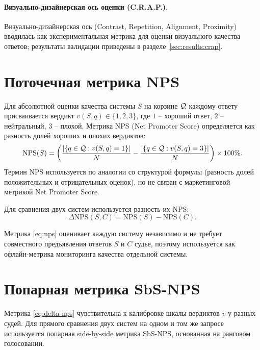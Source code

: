 \paragraph{Визуально-дизайнерская ось оценки (C.R.A.P.).}
Визуально-дизайнерская ось (Contrast, Repetition, Alignment, Proximity) вводилась как экспериментальная метрика для оценки визуального качества ответов; результаты валидации приведены в разделе~\ref{sec:results:crap}.

\section{Поточечная метрика NPS}
\label{sec:method:nps}

Для абсолютной оценки качества системы $S$ на корзине $\mathcal{Q}$ каждому
ответу присваивается вердикт $v(S, q) \in \{1, 2, 3\}$, где
$1$ -- хороший ответ, $2$ -- нейтральный, $3$ -- плохой.
Метрика NPS (Net Promoter Score) определяется как разность долей
хороших и плохих вердиктов:
\begin{equation}
    \label{eq:nps}
    \mathrm{NPS}(S) =
        \left(
            \frac{\left\lvert\{q \in \mathcal{Q} : v(S,q) = 1\}\right\rvert}{N}
            -
            \frac{\left\lvert\{q \in \mathcal{Q} : v(S,q) = 3\}\right\rvert}{N}
        \right)
        \times 100\%.
\end{equation}
\footnotesize Термин NPS используется по аналогии со структурой формулы (разность долей положительных и отрицательных оценок), но не связан с маркетинговой метрикой Net Promoter Score.\normalsize

Для сравнения двух систем используется разность их NPS:
\begin{equation}
    \label{eq:delta-nps}
    \Delta\mathrm{NPS}(S, C) = \mathrm{NPS}(S) - \mathrm{NPS}(C).
\end{equation}

Метрика \eqref{eq:nps} оценивает каждую систему независимо и не требует
совместного предъявления ответов $S$ и $C$ судье, поэтому используется
как офлайн-метрика мониторинга качества отдельной системы.

\section{Попарная метрика SbS-NPS}
\label{sec:method:sbs-nps}

Метрика \eqref{eq:delta-nps} чувствительна к калибровке шкалы
вердиктов $v$ у разных судей.
Для прямого сравнения двух систем на одном и том же запросе используется
попарная side-by-side метрика SbS-NPS, основанная на ранговом
голосовании.

